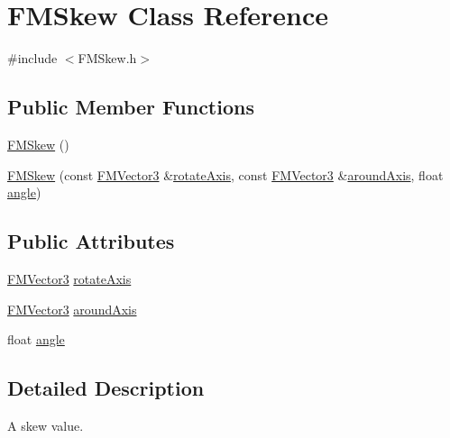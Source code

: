 \hypertarget{classFMSkew}{
\section{FMSkew Class Reference}
\label{classFMSkew}
}


{\ttfamily \#include $<$FMSkew.h$>$}

\subsection*{Public Member Functions}
\begin{DoxyCompactItemize}
\item 
\hyperlink{classFMSkew_aa668311a8e0eb9af847338f17f7f84d3}{FMSkew} ()
\item 
\hyperlink{classFMSkew_aed3d20ab9e8d8d974e23b8aa674de880}{FMSkew} (const \hyperlink{classFMVector3}{FMVector3} \&\hyperlink{classFMSkew_a7cf70bef4d980753e946c20ddbe24e80}{rotateAxis}, const \hyperlink{classFMVector3}{FMVector3} \&\hyperlink{classFMSkew_aeb3dfd593df446ebdc89996b803ff5f0}{aroundAxis}, float \hyperlink{classFMSkew_a3001b0a58b660f6b4677aa6e0381e25e}{angle})
\end{DoxyCompactItemize}
\subsection*{Public Attributes}
\begin{DoxyCompactItemize}
\item 
\hyperlink{classFMVector3}{FMVector3} \hyperlink{classFMSkew_a7cf70bef4d980753e946c20ddbe24e80}{rotateAxis}
\item 
\hyperlink{classFMVector3}{FMVector3} \hyperlink{classFMSkew_aeb3dfd593df446ebdc89996b803ff5f0}{aroundAxis}
\item 
float \hyperlink{classFMSkew_a3001b0a58b660f6b4677aa6e0381e25e}{angle}
\end{DoxyCompactItemize}


\subsection{Detailed Description}
A skew value. 

